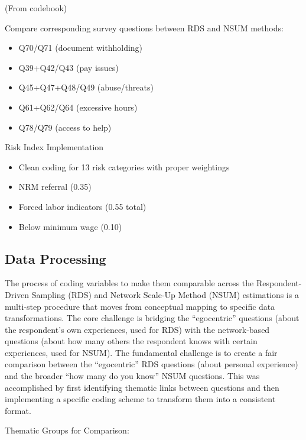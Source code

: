 \documentclass[
  12pt,
  letterpaper,
  DIV=11,
  numbers=noendperiod]{scrartcl}
\providecommand{\tightlist}{%
  \setlength{\itemsep}{0pt}\setlength{\parskip}{0pt}}
\theoremstyle{plain}
\theoremstyle{definition}
\begin{document}
(From codebook)

Compare corresponding survey questions between RDS and NSUM methods:

\begin{itemize}
\tightlist
\item
  Q70/Q71 (document withholding)
\item
  Q39+Q42/Q43 (pay issues)
\item
  Q45+Q47+Q48/Q49 (abuse/threats)
\item
  Q61+Q62/Q64 (excessive hours)
\item
  Q78/Q79 (access to help)
\end{itemize}

Risk Index Implementation

\begin{itemize}
\tightlist
\item
  Clean coding for 13 risk categories with proper weightings
\item
  NRM referral (0.35)
\item
  Forced labor indicators (0.55 total)
\item
  Below minimum wage (0.10)
\end{itemize}

\subsection{Data Processing}\label{app-dataprep}

The process of coding variables to make them comparable across the
Respondent-Driven Sampling (RDS) and Network Scale-Up Method (NSUM)
estimations is a multi-step procedure that moves from conceptual mapping
to specific data transformations. The core challenge is bridging the
``egocentric'' questions (about the respondent's own experiences, used
for RDS) with the network-based questions (about how many others the
respondent knows with certain experiences, used for NSUM). The
fundamental challenge is to create a fair comparison between the
``egocentric'' RDS questions (about personal experience) and the broader
``how many do you know'' NSUM questions. This was accomplished by first
identifying thematic links between questions and then implementing a
specific coding scheme to transform them into a consistent format.

Thematic Groups for Comparison:
\end{document}
